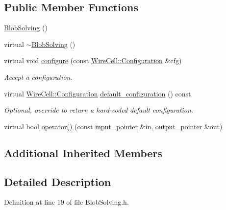 \subsection*{Public Member Functions}
\begin{DoxyCompactItemize}
\item 
\hyperlink{class_wire_cell_1_1_img_1_1_blob_solving_aa60935615479b55fc20b30101e2002a6}{Blob\+Solving} ()
\item 
virtual \hyperlink{class_wire_cell_1_1_img_1_1_blob_solving_aa376d33f4fa399cf5a0ea8895c37c39e}{$\sim$\+Blob\+Solving} ()
\item 
virtual void \hyperlink{class_wire_cell_1_1_img_1_1_blob_solving_aeab36fb3d4e62c0ca40ae7ca22ebd875}{configure} (const \hyperlink{namespace_wire_cell_a9f705541fc1d46c608b3d32c182333ee}{Wire\+Cell\+::\+Configuration} \&cfg)
\begin{DoxyCompactList}\small\item\em Accept a configuration. \end{DoxyCompactList}\item 
virtual \hyperlink{namespace_wire_cell_a9f705541fc1d46c608b3d32c182333ee}{Wire\+Cell\+::\+Configuration} \hyperlink{class_wire_cell_1_1_img_1_1_blob_solving_a59d264243d5395add0898a428405a613}{default\+\_\+configuration} () const
\begin{DoxyCompactList}\small\item\em Optional, override to return a hard-\/coded default configuration. \end{DoxyCompactList}\item 
virtual bool \hyperlink{class_wire_cell_1_1_img_1_1_blob_solving_ae1e30c85e18ad7e21a4d16c920ef8fae}{operator()} (const \hyperlink{class_wire_cell_1_1_i_function_node_a55c0946156df9b712b8ad1a0b59b2db6}{input\+\_\+pointer} \&in, \hyperlink{class_wire_cell_1_1_i_function_node_afc02f1ec60d31aacddf64963f9ca650b}{output\+\_\+pointer} \&out)
\end{DoxyCompactItemize}
\subsection*{Additional Inherited Members}


\subsection{Detailed Description}


Definition at line 19 of file Blob\+Solving.\+h.



